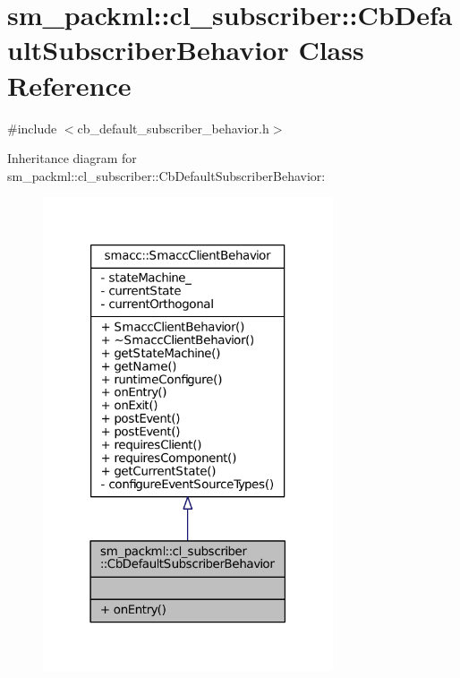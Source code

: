 \hypertarget{classsm__packml_1_1cl__subscriber_1_1CbDefaultSubscriberBehavior}{}\section{sm\+\_\+packml\+:\+:cl\+\_\+subscriber\+:\+:Cb\+Default\+Subscriber\+Behavior Class Reference}
\label{classsm__packml_1_1cl__subscriber_1_1CbDefaultSubscriberBehavior}


{\ttfamily \#include $<$cb\+\_\+default\+\_\+subscriber\+\_\+behavior.\+h$>$}



Inheritance diagram for sm\+\_\+packml\+:\+:cl\+\_\+subscriber\+:\+:Cb\+Default\+Subscriber\+Behavior\+:
\nopagebreak
\begin{figure}[H]
\begin{center}
\leavevmode
\includegraphics[width=243pt]{classsm__packml_1_1cl__subscriber_1_1CbDefaultSubscriberBehavior__inherit__graph}
\end{center}
\end{figure}


